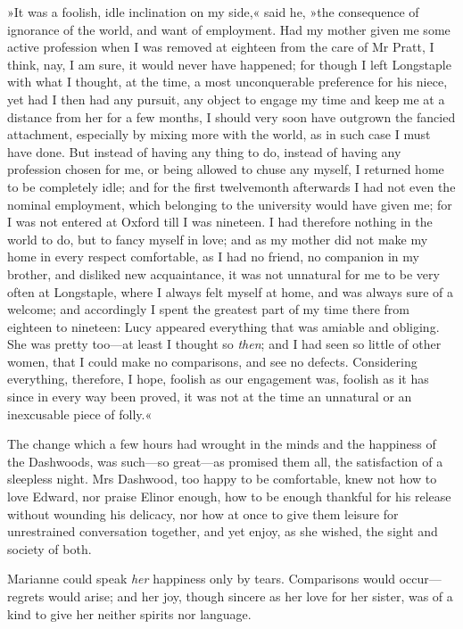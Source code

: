 »It was a foolish, idle inclination on my side,« said he, »the consequence of ignorance of the world, and want of employment. Had my mother given me some active profession when I was removed at eighteen from the care of Mr Pratt, I think, nay, I am sure, it would never have happened; for though I left Longstaple with what I thought, at the time, a most unconquerable preference for his niece, yet had I then had any pursuit, any object to engage my time and keep me at a distance from her for a few months, I should very soon have outgrown the fancied attachment, especially by mixing more with the world, as in such case I must have done. But instead of having any thing to do, instead of having any profession chosen for me, or being allowed to chuse any myself, I returned home to be completely idle; and for the first twelvemonth afterwards I had not even the nominal employment, which belonging to the university would have given me; for I was not entered at Oxford till I was nineteen. I had therefore nothing in the world to do, but to fancy myself in love; and as my mother did not make my home in every respect comfortable, as I had no friend, no companion in my brother, and disliked new acquaintance, it was not unnatural for me to be very often at Longstaple, where I always felt myself at home, and was always sure of a welcome; and accordingly I spent the greatest part of my time there from eighteen to nineteen: Lucy appeared everything that was amiable and obliging. She was pretty too—at least I thought so \textit{then}; and I had seen so little of other women, that I could make no comparisons, and see no defects. Considering everything, therefore, I hope, foolish as our engagement was, foolish as it has since in every way been proved, it was not at the time an unnatural or an inexcusable piece of folly.«

The change which a few hours had wrought in the minds and the happiness of the Dashwoods, was such—so great—as promised them all, the satisfaction of a sleepless night. Mrs Dashwood, too happy to be comfortable, knew not how to love Edward, nor praise Elinor enough, how to be enough thankful for his release without wounding his delicacy, nor how at once to give them leisure for unrestrained conversation together, and yet enjoy, as she wished, the sight and society of both.

Marianne could speak \textit{her} happiness only by tears. Comparisons would occur—regrets would arise; and her joy, though sincere as her love for her sister, was of a kind to give her neither spirits nor language.

